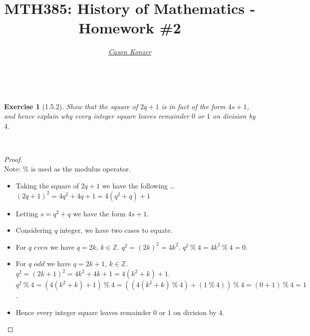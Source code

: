 \documentclass[12pt]{article}
\newcommand{\XB}{\color{black}}
\newcommand{\XBB}{\color{blue}}
\newcommand{\XV}{\color{violet}}
\theoremstyle{plain}
\newtheorem{ex}{Exercise}
\begin{document}
\title{\textbf{MTH385}: History of Mathematics - Homework \#2}
\date{}
\author{\XV\textit{\large{\href{https://github.com/casonk}{Cason Konzer}}}\XB}

\maketitle

\hrulefill

\newpage

\XBB\hrulefill\XB \\
\begin{ex} [1.5.2]
  Show that the square of $2q+1$ is in fact of the form $4s+1$, and hence explain why every integer square leaves remainder $0$ or $1$ on division by $4$.
\end{ex}
\XBB\hrulefill\XB \\
\begin{proof}
  \ \\
  Note: $\%$ is used as the modulus operator.
  \begin{itemize}
    \item Taking the square of $2q+1$ we have the following \dots
    \subitem $ (2q+1)^{2} = 4q^{2} + 4q + 1 = 4(q^{2} + q) + 1$
    \item Letting $ s = q^{2} + q $ we have the form $4s+1$.
    \item Considering $ q $ integer, we have two cases to equate.
    \item For $ q $ $even$ we have $ q = 2k$, $k \in \mathbb{Z} $.
    \subitem $ q^{2} = (2k)^{2} = 4k^{2} $.
    \subitem $ q^{2} \ \% \ 4 = 4k^{2} \ \% \ 4 = 0 $.
    \item For $ q $ $odd$ we have $ q = 2k+1$, $k \in \mathbb{Z} $.
    \subitem $ q^{2} = (2k+1)^{2} = 4k^{2} + 4k + 1 = 4(k^{2} + k) + 1 $.
    \subitem $ q^{2} \ \% \ 4 = (4(k^{2} + k) + 1) \ \% \ 4 = ((4(k^{2}+k) \ \% \ {4})+(1 \ \% \ {4})) \ \% \ {4} = (0+1) \ \% \ {4} = 1 $.
    \item Hence every integer square leaves remainder $0$ or $1$ on division by $4$.
  \end{itemize}
\end{proof}
\end{document}
